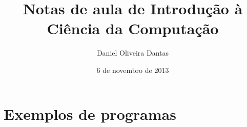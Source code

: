 \documentclass{book}
\title{Notas de aula de Introdução à Ciência da Computação}
\author{Daniel Oliveira Dantas}
\date{6 de novembro de 2013}
\begin{document}
\maketitle


\tableofcontents
\pagestyle{plain}



































\chapter{Exemplos de programas}
\end{document}
